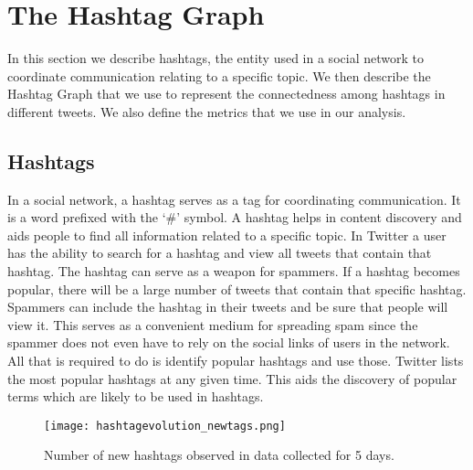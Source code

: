 \documentclass[journal, a4paper, 12pt]{article}
\begin{document}

    
\section{The Hashtag Graph }

In this section we describe hashtags, the entity used in a social network to coordinate communication relating to a specific topic. We then describe the Hashtag Graph that we use to represent the connectedness among hashtags in different tweets. We also define the metrics that we use in our analysis.

\subsection{Hashtags}
In a social network, a hashtag serves as a tag for coordinating communication. It is  a word prefixed with the ‘\#’ symbol. A hashtag helps in content discovery and aids people to find all information related to a specific topic. In Twitter a user has the ability to search for a hashtag and view all tweets that contain that hashtag. The hashtag can serve as a weapon for spammers. If a hashtag becomes popular, there will be a large number of tweets that contain that specific hashtag. Spammers can include the hashtag in their tweets and be sure that people will view it. This serves as a convenient medium for spreading spam since the spammer does not even have to rely on the social links of users in the network. All that is required to do is identify popular hashtags and use those. Twitter lists the most popular hashtags at any given time. This aids the discovery of popular terms which are likely to be used in hashtags.\\

      \begin{figure}[!hbt]
            \begin{center}
            \texttt{[image: hashtagevolution\_newtags.png]}
            \caption{Number of new hashtags observed in data collected for 5 days.}
            \label{fig:hashtagevolution}
            \end{center}
      \end{figure}
\end{document}
